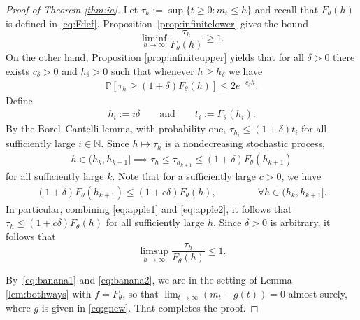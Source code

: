 \documentclass[a4,12pt]{amsart}
\numberwithin{equation}{section}
\begin{document}
\begin{proof}[Proof of Theorem \ref{thm:ia}]
\color{black}
	Let $\tau_h := \sup \{ t \geq 0: m_t \leq h \}$ and recall that  $F_\theta(h)$ is defined in \eqref{eq:Fdef}. 
	Proposition~\ref{prop:infinitelower} gives the bound
	\begin{equation}\label{eq:banana1}
		\liminf_{h \to \infty} \frac{\tau_h}{F_\theta(h)} \geq 1.
	\end{equation}
	On the other hand, 
	Proposition \ref{prop:infiniteupper} yields that for all $\delta > 0$ 
	there exists $c_\delta > 0$ and $h_\delta > 0$ such that whenever $h \geq h_\delta$ we have
	\begin{align*}
		\mathbb{P} \left[ \tau_h  \geq (1+\delta)F_\theta(h) \right] \leq 2e^{ - c_\delta h}.
	\end{align*}
	Define
		\begin{align*}
			h_i := i\delta \qquad \text{and} \qquad 
			t_i := F_\theta(h_i).
		\end{align*}
		By the Borel--Cantelli lemma, with probability one, 
		$\tau_{h_i} \leq (1+\delta)t_i$ for all sufficiently large $i\in\mathbb N$. 
		Since $h \mapsto \tau_h$ is a nondecreasing stochastic process, 
		\begin{align} \label{eq:apple1}
			h \in (h_k,h_{k+1}] 
			\implies 
			\tau_h \leq \tau_{h_{k+1}} \leq (1+\delta)F_\theta(h_{k+1})
		\end{align}
		for all sufficiently large $k$. 
		Note that for a sufficiently large $c > 0$, we have 
		\begin{align} \label{eq:apple2}
	(1+\delta)F_\theta(h_{k+1}) \leq (1+c\delta) F_\theta(h), 
			\qquad  \qquad  ~\forall h \in (h_k,h_{k+1}].
		\end{align}
		In particular, combining \eqref{eq:apple1} and \eqref{eq:apple2}, 
		it follows that $\tau_h \leq (1 + c \delta) F_\theta(h)$ for all 
		sufficiently large $h$. Since $\delta > 0$ is arbitrary, it follows that
		\begin{equation}\label{eq:banana2}
			\limsup_{h \to \infty} \frac{\tau_h}{F_\theta(h)} \leq 1.
		\end{equation}

		By~\eqref{eq:banana1} and \eqref{eq:banana2}, we are in the setting of Lemma \ref{lem:bothways}
	with $f=F_\theta$, so that $\lim_{t \to \infty} (m_t - g(t)) = 0 $ almost surely, where $g$ is given in \eqref{eq:gnew}. 
That completes the proof.

\end{proof}
\end{document}
